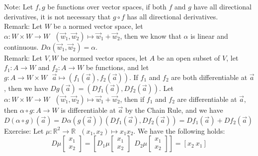 \documentclass[15pt]{book}
\theoremstyle{break}
\theoremstyle{break}
\newcommand{\R}{\mathbb{R}}
\newcommand{\note}{\color{red}Note: \color{black}}
\newcommand{\remark}{\color{blue}Remark: \color{black}}
\newcommand{\exercise}{\color{green}Exercise: \color{black}}
\begin{document}
\note Let $f,g$ be functions over vector spaces, if both $f$ and $g$ have all directional derivatives, it is not necessary that $g\circ f$ has all directional derivatives.\\

\remark Let $W$ be a normed vector space, let $\alpha:W\times W \to W \ \ \ (\vec{w}_1,\vec{w}_2)\mapsto \vec{w}_1+\vec{w}_2$, then we know that $\alpha$ is linear and continuous. $D\alpha (\vec{w}_1,\vec{w}_2) = \alpha$.\\


\newpage
\remark Let $V,W$ be normed vector spaces, let $A$ be an open subset of $V$, let $f_1:A \to W$ and $f_2:A \to W$ be functions, and let $g:A \to W\times W \ \ \ \vec{a}\mapsto (f_1(\vec{a}),f_2(\vec{a}))$. If $f_1$ and $f_2$ are both differentiable at $\vec{a}$, then we have $Dg(\vec{a}) = (Df_1(\vec{a}),Df_2(\vec{a}))$. Let $\alpha:W\times W \to W \ \ \ (\vec{w}_1,\vec{w}_2)\mapsto \vec{w}_1+\vec{w}_2$, then if $f_1$ and $f_2$ are differentiable at $\vec{a}$, then $\alpha\circ g: A \to W$ is differentiable at $\vec{a}$ by the Chain Rule, and we have $D(\alpha \circ g)(\vec{a})=D\alpha(g(\vec{a}))(Df_1(\vec{a}),Df_2(\vec{a})) = Df_1(\vec{a})+Df_2(\vec{a})$ \\

\exercise Let $\mu:\R^2 \to \R\ \ \ (x_1,x_2)\mapsto x_1x_2$. We have the following holds:
$$D\mu
\begin{bmatrix} x_1\\ x_2 \end{bmatrix} = \left[
D_1\mu\begin{bmatrix}x_1\\ x_2\end{bmatrix} \ \ D_2\mu\begin{bmatrix}x_1\\ x_2\end{bmatrix}\right] = [x_2\ x_1]$$
\end{document}
